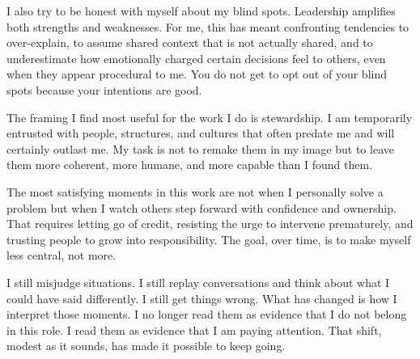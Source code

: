\documentclass[10pt]{article}
\begin{document}
I also try to be honest with myself about my blind spots. Leadership amplifies both strengths
and weaknesses. For me, this has meant confronting tendencies to over-explain, to assume shared
context that is not actually shared, and to underestimate how emotionally charged certain
decisions feel to others, even when they appear procedural to me. You do not get to opt out of
your blind spots because your intentions are good.


The framing I find most useful for the work I do is stewardship. I am temporarily entrusted
with people, structures, and cultures that often predate me and will certainly outlast me. My
task is not to remake them in my image but to leave them more coherent, more humane, and more
capable than I found them.

The most satisfying moments in this work are not when I personally solve a problem but when I
watch others step forward with confidence and ownership. That requires letting go of credit,
resisting the urge to intervene prematurely, and trusting people to grow into responsibility.
The goal, over time, is to make myself less central, not more.

I still misjudge situations. I still replay conversations and think about what I could have said
differently. I still get things wrong. What has changed is how I interpret those moments. I no
longer read them as evidence that I do not belong in this role. I read them as evidence that I
am paying attention. That shift, modest as it sounds, has made it possible to keep going.

\end{document}
